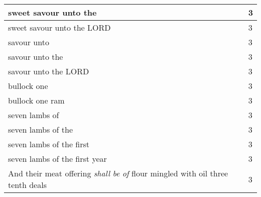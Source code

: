 \begin{center}
\begin{longtable}{|p{3.0in}|p{0.5in}|}
sweet savour unto the & 3\\ \hline 
sweet savour unto the LORD & 3\\ \hline 
savour unto & 3\\ \hline 
savour unto the & 3\\ \hline 
savour unto the LORD & 3\\ \hline 
bullock one & 3\\ \hline 
bullock one ram & 3\\ \hline 
seven lambs of & 3\\ \hline 
seven lambs of the & 3\\ \hline 
seven lambs of the first & 3\\ \hline 
seven lambs of the first year & 3\\ \hline 

And their meat offering \emph{shall} \emph{be} \emph{of} flour mingled with oil three tenth deals & 3\\ \hline 


\end{longtable}
\end{center}
